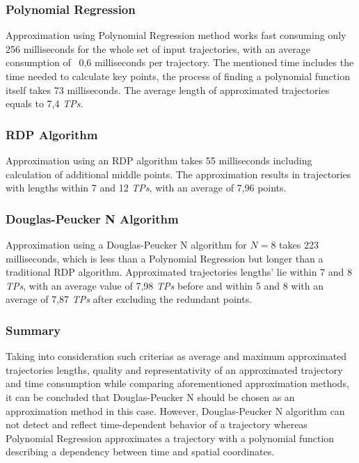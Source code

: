 \subsubsection{Polynomial Regression}

Approximation using Polynomial Regression method works fast consuming only 256 milliseconds for the whole set of input trajectories, with an average consumption of ~0,6 milliseconds per trajectory. The mentioned time includes the time needed to calculate key points, the process of finding a polynomial function itself takes 73 milliseconds. The average length of approximated trajectories equals to 7,4 \textit{TPs}.

\subsubsection{RDP Algorithm}

Approximation using an RDP algorithm takes 55 milliseconds including calculation of additional middle points. The approximation results in trajectories with lengths within 7 and 12 \textit{TPs}, with an average of 7,96 points.

\subsubsection{Douglas-Peucker N Algorithm}

Approximation using a Douglas-Peucker N algorithm for $N = 8$ takes 223 milliseconds, which is less than a Polynomial Regression but longer than a traditional RDP algorithm. Approximated trajectories lengths' lie within 7 and 8 \textit{TPs}, with an average value of 7,98 \textit{TPs} before and within 5 and 8 with an average of 7,87 \textit{TPs} after excluding the redundant points.

\subsubsection{Summary}

Taking into consideration such criterias as average and maximum approximated trajectories lengths, quality and representativity of an approximated trajectory and time consumption while comparing aforementioned approximation methods, it can be concluded that Douglas-Peucker N should be chosen as an approximation method in this case. However, Douglas-Peucker N algorithm can not detect and reflect time-dependent behavior of a trajectory whereas Polynomial Regression approximates a trajectory with a polynomial function describing a dependency between time and spatial coordinates. 

